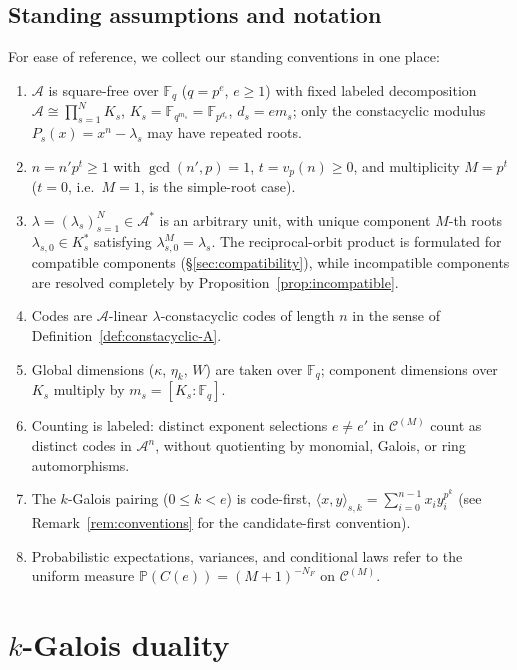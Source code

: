 \documentclass[preprint,12pt]{elsarticle}
\newcommand{\F}{\mathbb F}
\newcommand{\A}{\mathcal A}
\numberwithin{equation}{section}
\theoremstyle{plain}
\theoremstyle{definition}
\theoremstyle{remark}
\begin{document}
\subsection{Standing assumptions and notation}\label{sec:assumptions}

For ease of reference, we collect our standing conventions in one place:
\begin{enumerate}
\item[\textbf{A1.}] $\A$ is square-free over $\F_q$ ($q=p^e$, $e\ge 1$) with fixed
labeled decomposition $\A\cong\prod_{s=1}^{N}K_s$, $K_s=\F_{q^{m_s}}=\F_{p^{d_s}}$,
$d_s=em_s$; only the constacyclic modulus $P_s(x)=x^n-\lambda_s$ may have
repeated roots.
\item[\textbf{A2.}] $n=n'p^t\ge 1$ with $\gcd(n',p)=1$, $t=v_p(n)\ge 0$, and
multiplicity $M=p^t$ ($t=0$, i.e.\ $M=1$, is the simple-root case).
\item[\textbf{A3.}] $\lambda=(\lambda_s)_{s=1}^{N}\in\A^*$ is an arbitrary unit,
with unique component $M$-th roots $\lambda_{s,0}\in K_s^*$ satisfying
$\lambda_{s,0}^M=\lambda_s$. The reciprocal-orbit product is formulated for
compatible components (\S\ref{sec:compatibility}), while incompatible components
are resolved completely by Proposition~\ref{prop:incompatible}.
\item[\textbf{A4.}] Codes are $\A$-linear $\lambda$-constacyclic codes of length
$n$ in the sense of Definition~\ref{def:constacyclic-A}.
\item[\textbf{A5.}] Global dimensions ($\kappa$, $\eta_k$, $W$) are taken over
$\F_q$; component dimensions over $K_s$ multiply by $m_s=[K_s:\F_q]$.
\item[\textbf{A6.}] Counting is labeled: distinct exponent selections
$e\neq e'$ in $\mathscr C^{(M)}$ count as distinct codes in $\A^n$, without
quotienting by monomial, Galois, or ring automorphisms.
\item[\textbf{A7.}] The $k$-Galois pairing ($0\le k<e$) is code-first,
$\langle x,y\rangle_{s,k}=\sum_{i=0}^{n-1}x_i y_i^{p^k}$
(see Remark~\ref{rem:conventions} for the candidate-first convention).
\item[\textbf{A8.}] Probabilistic expectations, variances, and conditional laws
refer to the uniform measure $\mathbb P(C(e))=(M+1)^{-N_F}$ on $\mathscr C^{(M)}$.
\end{enumerate}

\section{\texorpdfstring{$k$}{k}-Galois duality}\label{sec:duality}
\end{document}
